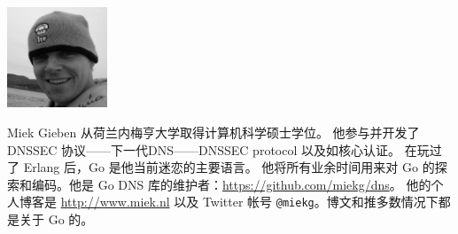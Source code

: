 \includegraphics[width=3cm]{fig/avatar-miekg-300x300}

Miek Gieben 从荷兰内梅亨大学取得计算机科学硕士学位。
他参与并开发了 DNSSEC 协议——下一代DNS——DNSSEC protocol 以及如核心认证\cite{RFC4641}。
在玩过了 Erlang 后，Go 是他当前迷恋的主要语言。
他将所有业余时间用来对 Go 的探索和编码。他是 Go DNS 库的维护者：\url{https://github.com/miekg/dns}。
他的个人博客是 \url{http://www.miek.nl} 以及 Twitter 帐号 \texttt{@miekg}。博文和推多数情况下都是关于 Go 的。
